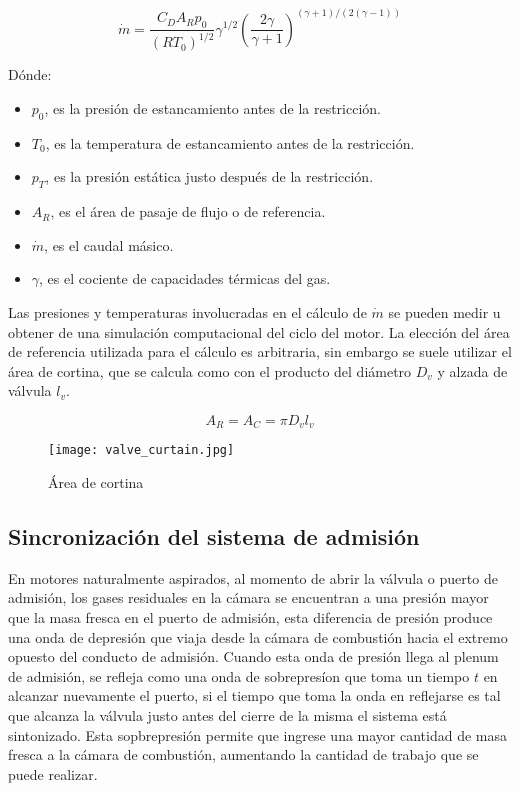 \begin{equation}\label{eq:m_bloqueado}
  \dot{m}=  \frac {C_D A_R p_0} {{(R T_0)}^{1/2}} \gamma^{1/2} {\left( \frac{2\gamma}{\gamma+1} \right)}^{(\gamma+1)/(2(\gamma-1))}
\end{equation}

Dónde:

\begin{itemize}
    \item $p_0$, es la presión de estancamiento antes de la restricción.
    \item $T_0$, es la temperatura de estancamiento antes de la restricción.
    \item $p_T$, es la presión estática justo después de la restricción.
    \item $A_R$, es el área de pasaje de flujo o de referencia.
    \item $\dot{m}$, es el caudal másico.


  \item $\gamma$, es el cociente de capacidades térmicas del gas.
\end{itemize}

Las presiones y temperaturas involucradas en el cálculo de $\dot{m}$ se pueden
medir u obtener de una simulación computacional del ciclo del motor.
%
La elección del área de referencia utilizada para el cálculo es arbitraria, sin
embargo se suele utilizar el área de cortina, que se calcula como con el
producto del diámetro $D_{v}$ y alzada de válvula $l_{v}$.

\begin{equation} \label{eq:area_cortina} A_R = A_C = \pi D_v l_v
\end{equation}

\begin{figure} \centering
\texttt{[image: valve\_curtain.jpg]}
  \caption{Área de cortina}\label{fig:area_cortina}
\end{figure}


\subsection{Sincronización del sistema de admisión}
%
En motores naturalmente aspirados, al momento de abrir la válvula o puerto de
admisión, los gases residuales en la cámara se encuentran a una presión mayor
que la masa fresca en el puerto de admisión, esta diferencia de presión produce
una onda de depresión que viaja desde la cámara de combustión hacia el extremo
opuesto del conducto de admisión.
%
Cuando esta onda de presión llega al plenum de admisión, se refleja como una
onda de sobrepresíon que toma un tiempo $t$ en alcanzar nuevamente el puerto, si
el tiempo que toma la onda en reflejarse es tal que alcanza la válvula justo
antes del cierre de la misma el sistema está sintonizado.
%
Esta sopbrepresión permite que ingrese una mayor cantidad de masa fresca a la
cámara de combustión, aumentando la cantidad de trabajo que se puede realizar.

